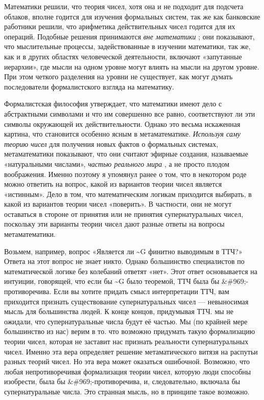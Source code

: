 \documentclass[../main.tex]{subfiles}
\begin{document}
Математики решили, что теория чисел, хотя она и не подходит для подсчета облаков, вполне годится для изучения формальных систем, так же как банковские работники решили, что арифметика действительных чисел годится для их операций. Подобные решения принимаются \emph{вне математики} ; они показывают, что мыслительные процессы, задействованные в изучении математики, так же, как и в других областях человеческой деятельности, включают «запутанные иерархии», где мысли на одном уровне могут влиять на мысли на другом уровне. При этом четкого разделения на уровни не существует, как могут думать последователи формалистского взгляда на математику.

Формалистская философия утверждает, что математики имеют дело с абстрактными символами и что им совершенно все равно, соответствуют ли эти символы окружающей их действительности. Однако это весьма искаженная картина, что становится особенно ясным в метаматематике. \emph{Используя саму теорию чисел} для получения новых фактов о формальных системах, метаматематики показывают, что они считают эфирные создания, называемые «натуральными числами», \emph{частью реального мира} , а не просто плодом воображения. Именно поэтому я упомянул ранее о том, что в некотором роде можно ответить на вопрос, какой из вариантов теории чисел является «истинным». Дело в том, что математическим логикам приходится выбирать, в какой из вариантов теории чисел «поверить». В частности, они не могут оставаться в стороне от принятия или не принятия супернатуральных чисел, поскольку эти варианты теории чисел дают разные ответы на вопросы метаматематики.

Возьмем, например, вопрос «Является ли \textasciitilde G финитно выводимым в ТТЧ?» Ответа на этот вопрос не знает никто. Однако большинство специалистов по математической логике без колебаний ответят «нет». Этот ответ основывается на интуиции, говорящей, что если бы \textasciitilde G было теоремой, ТТЧ была бы \&\#969;-противоречива. Если вы хотите придать смысл интерпретации ТТЧ, вам приходится признать существование супернатуральных чисел --- невыносимая мысль для большинства людей. К конце концов, придумывая ТТЧ. мы не ожидали, что супернатуральные числа будут её частью. Мы (по крайней мере большинство из нас) верим в то. что возможно придумать такую формализацию теории чисел, которая не заставит нас признать реальности супернатуральных чисел. Именно эта вера определяет решение метаматического витязя на распутьи разных теорий чисел. Но эта вера может оказаться ошибочной. Возможно, что любая непротиворечивая формализация теории чисел, которую люди способны изобрести, была бы \&\#969;-противоречива, и, следовательно, включала бы супернатуральные числа. Это странная мысль, но в принципе такое возможно.
\end{document}
